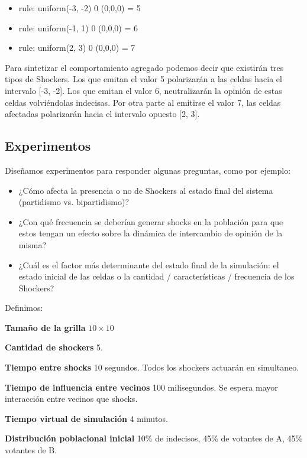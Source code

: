 \begin{itemize}
    \item rule: {  uniform(-3, -2) } 0 { (0,0,0) = 5 }
    \item rule: {  uniform(-1, 1)  } 0 { (0,0,0) = 6 }
    \item rule: {  uniform(2, 3) } 0 { (0,0,0) = 7 } 
\end{itemize}

Para sintetizar el comportamiento agregado podemos decir que existirán tres tipos de Shockers. Los que emitan el valor 5 polarizarán a las celdas hacia el intervalo [-3, -2]. Los que emitan el valor 6, neutralizarán la opinión de estas celdas volviéndolas indecisas. Por otra parte al emitirse el valor 7, las celdas afectadas polarizarán hacia el intervalo opuesto [2, 3].

\subsection{Experimentos}

Diseñamos experimentos para responder algunas preguntas, como por ejemplo:
\begin{itemize}
\item ¿Cómo afecta la presencia o no de Shockers al estado final del sistema (partidismo vs. bipartidismo)?
\item ¿Con qué frecuencia se deberían generar shocks en la población para que estos tengan un efecto sobre la dinámica de intercambio de opinión de la misma?
\item ¿Cuál es el factor más determinante del estado final de la simulación: el estado inicial de las celdas o la cantidad / características / frecuencia de los Shockers?
\end{itemize}

Definimos:

\begin{description}
    \item \textbf{Tamaño de la grilla}  $10 \times 10$
    \item \textbf{Cantidad de shockers} 5.
    \item \textbf{Tiempo entre shocks} 10 segundos. Todos los shockers actuarán en simultaneo.
    \item \textbf{Tiempo de influencia entre vecinos} 100 milisegundos. Se espera mayor interacción entre vecinos que shocks.
    \item \textbf{Tiempo virtual de simulación} 4 minutos.
    \item \textbf{Distribución poblacional inicial} 10\% de indecisos, 45\% de votantes de A, 45\% votantes de B.
\end{description}

